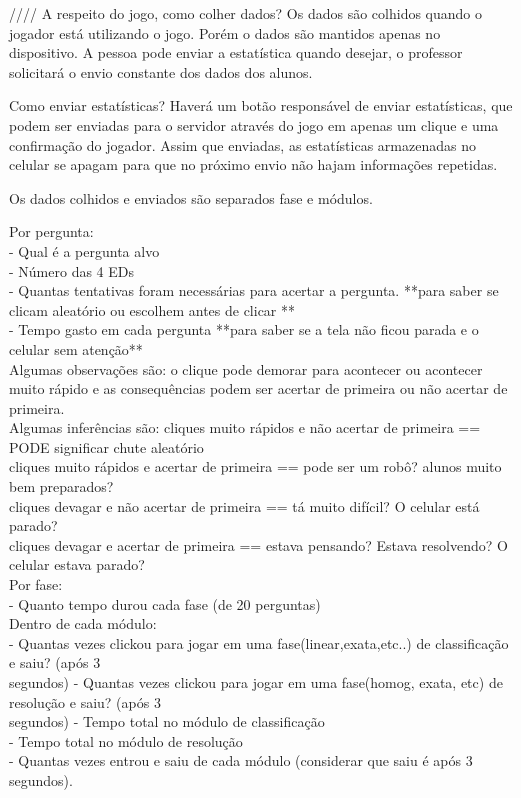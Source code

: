 ////
A respeito do jogo, como colher dados? Os dados são colhidos quando o jogador está utilizando o jogo. Porém o dados são mantidos apenas no dispositivo. A pessoa pode enviar a estatística quando desejar, o professor solicitará o envio constante dos dados dos alunos.

Como enviar estatísticas? Haverá um botão responsável de enviar estatísticas, que podem ser enviadas para o servidor através do jogo em apenas um clique e uma confirmação do jogador. Assim que enviadas, as estatísticas armazenadas no celular se apagam para que no próximo envio não hajam informações repetidas.

Os dados colhidos e enviados são separados fase e módulos.

Por pergunta:\\
	- Qual é a pergunta alvo\\
	- Número das 4 EDs\\
	- Quantas tentativas foram necessárias para acertar a pergunta. **para saber se clicam aleatório ou escolhem antes de clicar **\\
	- Tempo gasto em cada pergunta  **para saber se a tela não ficou parada e o celular sem atenção**\\

	Algumas observações são: o clique pode demorar para acontecer ou acontecer muito rápido e as consequências podem ser acertar de primeira ou não acertar de primeira.\\
	Algumas inferências são: 
	cliques muito rápidos e não acertar de primeira == PODE significar chute aleatório\\
	cliques muito rápidos e acertar de primeira == pode ser um robô? alunos muito bem preparados?\\
	cliques devagar e não acertar de primeira == tá muito difícil? O celular está parado? \\
	cliques devagar e acertar de primeira == estava pensando? Estava resolvendo? O celular estava parado?\\

Por fase:\\
	- Quanto tempo durou cada fase (de 20 perguntas)\\

Dentro de cada módulo:\\
	- Quantas vezes clickou para jogar em uma fase(linear,exata,etc..) de classificação e saiu? (após 3 \\segundos)
	- Quantas vezes clickou para jogar em uma fase(homog, exata, etc) de resolução e saiu? (após 3 \\segundos)
	- Tempo total no módulo de classificação\\
	- Tempo total no módulo de resolução\\
	- Quantas vezes entrou e saiu de cada módulo (considerar que saiu é após 3 segundos).\\


